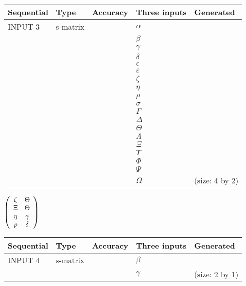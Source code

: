\documentclass[12pt]{article}
\begin{document}
  
\noindent\begin{tabular}{|l|l|l|l|l|}
\hline
 Sequential & Type & Accuracy & Three inputs & Generated \\ 
\hline
 
 
  INPUT $           3$ & s-matrix & & 
 $  \alpha $ & 
  \\
  & & & 
 $  \beta $ & 
  \\
  & & & 
 $  \gamma $ & 
  \\
  & & & 
 $  \delta $ & 
  \\
  & & & 
 $  \epsilon $ & 
  \\
  & & & 
 $  \varepsilon $ & 
  \\
  & & & 
 $                     \zeta $ & 
  \\
  & & & 
 $  \eta $ & 
  \\
  & & & 
 $  \rho $ & 
  \\
  & & & 
 $  \sigma $ & 
  \\
  & & & 
 $  \Gamma $ & 
  \\
  & & & 
 $  \Delta $ & 
  \\
  & & & 
 $  \Theta $ & 
  \\
  & & & 
 $  \Lambda $ & 
  \\
  & & & 
 $                     \Xi $ & 
  \\
  & & & 
 $  \Upsilon $ & 
  \\
  & & & 
 $  \Phi $ & 
  \\
  & & & 
 $  \Psi $ & 
  \\
  & & & 
 $  \Omega $ & 
  (size:           4 by           2)
 \\  \hline  
 \end{tabular}
   
   
 $  \left( \begin{array}
 {
 c
 c
 }
                    \zeta & 
 \Theta \\ 
                    \Xi & 
 \Theta \\ 
 \eta & 
 \gamma \\ 
 \rho & 
 \delta
 \end{array} \right) $ 
  
  
\noindent\begin{tabular}{|l|l|l|l|l|}
\hline
 Sequential & Type & Accuracy & Three inputs & Generated \\ 
\hline
 
 
  INPUT $           4$ & s-matrix & & 
 $  \beta $ & 
  \\
  & & & 
 $  \gamma $ & 
  (size:           2 by           1)
 \\  \hline  
 \end{tabular}
   
\end{document}
